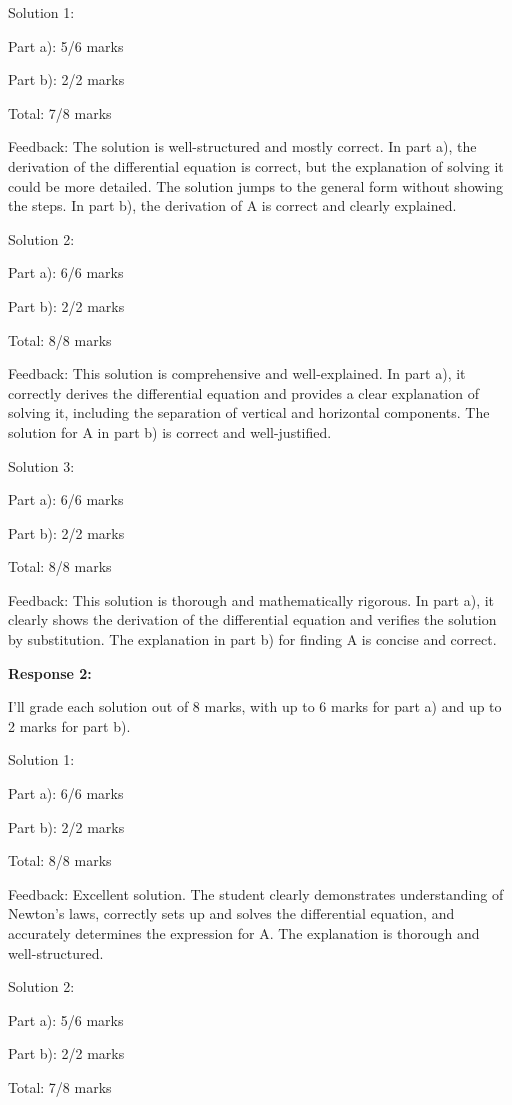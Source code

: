 \documentclass[a4paper,11pt]{article}
\begin{document}
Solution 1:

Part a): 5/6 marks

Part b): 2/2 marks

Total: 7/8 marks

Feedback: The solution is well-structured and mostly correct. In part a), the derivation of the differential equation is correct, but the explanation of solving it could be more detailed. The solution jumps to the general form without showing the steps. In part b), the derivation of A is correct and clearly explained.

Solution 2:

Part a): 6/6 marks

Part b): 2/2 marks

Total: 8/8 marks

Feedback: This solution is comprehensive and well-explained. In part a), it correctly derives the differential equation and provides a clear explanation of solving it, including the separation of vertical and horizontal components. The solution for A in part b) is correct and well-justified.

Solution 3:

Part a): 6/6 marks

Part b): 2/2 marks

Total: 8/8 marks

Feedback: This solution is thorough and mathematically rigorous. In part a), it clearly shows the derivation of the differential equation and verifies the solution by substitution. The explanation in part b) for finding A is concise and correct.

\bigskip
\textbf{Response 2:}

I'll grade each solution out of 8 marks, with up to 6 marks for part a) and up to 2 marks for part b).

Solution 1:

Part a): 6/6 marks

Part b): 2/2 marks

Total: 8/8 marks

Feedback: Excellent solution. The student clearly demonstrates understanding of Newton's laws, correctly sets up and solves the differential equation, and accurately determines the expression for A. The explanation is thorough and well-structured.

Solution 2:

Part a): 5/6 marks

Part b): 2/2 marks

Total: 7/8 marks
\end{document}
